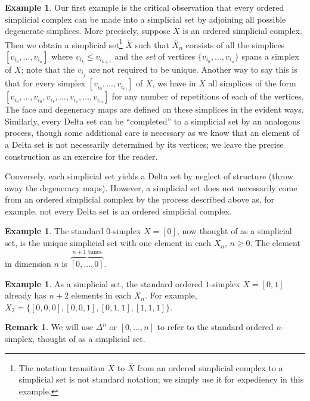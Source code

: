 \documentclass[12pt]{article}
\theoremstyle{plain}
\theoremstyle{definition}
\newtheorem{remark}[theorem]{Remark}
\newtheorem{example}[theorem]{Example}
\begin{document}
\begin{example}\label{E: comp to set}
Our first example is the critical observation that every ordered simplicial complex  can be made into a simplicial set by adjoining all possible degenerate simplices. More precisely, suppose $X$ is an ordered simplicial complex. Then we obtain a simplicial set\footnote{The notation transition $X$ to $\bar X$ from an ordered simplicial complex to a simplicial set is not standard notation; we simply use it for expediency in this example.} $\bar X$ such that $\bar X_n$ consists of all the simplices $[v_{i_0},\ldots,v_{i_n}]$ where $v_{i_k}\leq v_{i_{k+1}}$ and the \emph{set} of vertices $\{v_{i_0},\ldots,v_{i_n}\}$  spans a simplex of $X$; note that the $v_{i_j}$ are not required to be unique. Another way to say this is that for every simplex $[v_{i_0},\ldots,v_{i_m}]$ of $X$, we have in $\bar X$ all simplices of the form $[v_{i_0},\ldots,v_{i_0}, v_{i_1},\ldots, v_{i_1},\ldots, v_{i_m}]$ for any number of repetitions of each of the vertices. The face and degeneracy maps are defined on these simplices in the evident ways. Similarly, every Delta set can be ``completed'' to a simplicial set by an analogous process, though some additional care is necessary as we know that an element of a Delta set is not necessarily determined by its vertices; we leave the precise construction as an exercise for the reader.


Conversely, each simplicial set yields a Delta set by neglect of structure (throw away the degeneracy maps). However, a simplicial set does not necessarily come from an ordered simplicial complex by the process described above as, for example, not every Delta set is an ordered simplicial complex.
\end{example}


\begin{example}
The standard $0$-simplex $X=[0]$, now thought of as a simplicial set, is the unique simplicial set with one element in each $X_n$, $n\geq 0$. The element in dimension $n$ is $\overset{n+1 \text{ times}}{\overbrace{[0,\ldots,0]}}$. 
\end{example}

\begin{example}
As a simplicial set, the standard ordered $1$-simplex $X=[0,1]$ already has $n+2$ elements in each $X_n$. For example, $X_2=\{[0,0,0], [0,0,1],[0,1,1],[1,1,1]\}$. 
\end{example}

\begin{remark}
We will   use $\Delta^n$ or $[0,\ldots, n]$ to refer to the standard ordered $n$-simplex, thought of  as a simplicial set. 
\end{remark}
\end{document}
